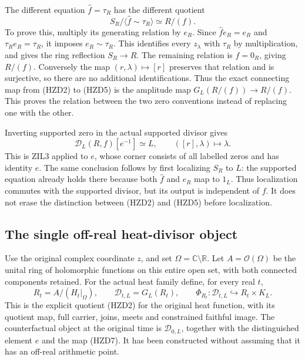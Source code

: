 The different equation $\widehat f=\tau_R$ has the different quotient
\begin{equation}\tag{HZD5}
 S_R/\langle\widehat f\sim\tau_R\rangle\simeq R/(f).
\end{equation}
To prove this, multiply its generating relation by $e_R$. Since
$\widehat f e_R=e_R$ and $\tau_Re_R=\tau_R$, it imposes
$e_R\sim\tau_R$. This identifies every $z_\lambda$ with $\tau_R$
by multiplication, and gives the ring reflection $S_R\to R$.
The remaining relation is $f=0_R$, giving $R/(f)$. Conversely the
map $(r,\lambda)\mapsto[r]$ preserves that relation and is surjective,
so there are no additional identifications. Thus the exact connecting
map from (HZD2) to (HZD5) is the amplitude map
$G_L(R/(f))\to R/(f)$. This proves the relation between the two
zero conventions instead of replacing one with the other.

Inverting supported zero in the actual supported divisor gives
\begin{equation}\tag{HZD6}
 \mathcal D_L(R,f)[e^{-1}]\simeq L,\qquad
 ([r],\lambda)\longmapsto\lambda.
\end{equation}
This is ZIL3 applied to $e$, whose corner consists of all labelled
zeros and has identity $e$. The same conclusion follows by first
localizing $S_R$ to $L$: the supported equation already holds there
because both $\widehat f$ and $e_R$ map to $1_L$. Thus localization
commutes with the supported divisor, but its output is independent
of $f$. It does not erase the distinction between (HZD2) and (HZD5)
before localization.

\subsection{The single off-real heat-divisor object}

Use the original complex coordinate $z$, and set
$\Omega=\mathbb C\setminus\mathbb R$. Let
$A=\mathcal O(\Omega)$ be the unital ring of holomorphic functions
on this entire open set, with both connected components retained.
For the actual heat family define, for every real $t$,
\begin{equation}\tag{HZD7}
 R_t=A/(H_t|_\Omega),\qquad
 \mathscr D_{t,L}=G_L(R_t),\qquad
 \Phi_{R_t}:\mathscr D_{t,L}\hookrightarrow R_t\times K_L.
\end{equation}
This is the explicit quotient (HZD2) for the original heat function,
with its quotient map, full carrier, joins, meets and constrained
faithful image. The counterfactual object at the original time is
$\mathscr D_{0,L}$, together with the distinguished element $e$ and
the map (HZD7). It has been constructed without assuming that it
has an off-real arithmetic point.

